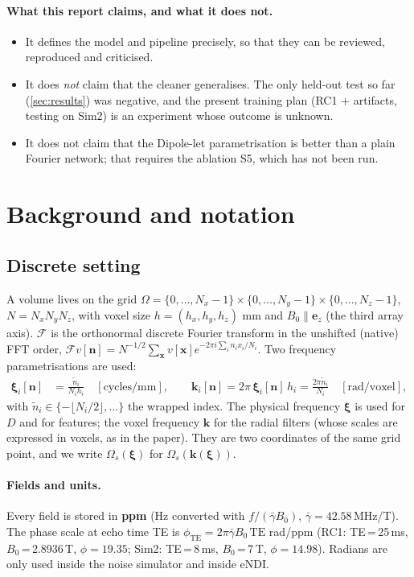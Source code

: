 \documentclass[11pt]{article}
\newcommand{\F}{\mathcal{F}}
\newcommand{\bk}{\bm{k}}
\newcommand{\bx}{\bm{x}}
\newcommand{\bxi}{\bm{\xi}}
\newcommand{\bn}{\bm{n}}
\theoremstyle{remark}
\begin{document}
\paragraph{What this report claims, and what it does not.}
\begin{itemize}[leftmargin=1.5em,itemsep=1pt]
\item It defines the model and pipeline precisely, so that they can be reviewed, reproduced and criticised.
\item It does \emph{not} claim that the cleaner generalises. The only held-out test so far (\cref{sec:results}) was negative, and the present training plan (RC1 + artifacts, testing on Sim2) is an
experiment whose outcome is unknown.
\item It does not claim that the Dipole-let parametrisation is better than a plain Fourier network; that requires the ablation S5, which has not been run.
\end{itemize}

\section{Background and notation}\label{sec:background}

\subsection{Discrete setting}
A volume lives on the grid $\Omega=\{0,\dots,N_x-1\}\times\{0,\dots,N_y-1\}\times\{0,\dots,N_z-1\}$, $N=N_xN_yN_z$, with voxel size $h=(h_x,h_y,h_z)$ mm and $B_0\parallel \bm e_z$ (the third array axis).
$\F$ is the orthonormal discrete Fourier transform in the unshifted (native) FFT order, $\F v[\bn]=N^{-1/2}\sum_{\bx} v[\bx]e^{-2\pi i\sum_i n_ix_i/N_i}$.
Two frequency parametrisations are used:
\begin{align}
\bxi_i[\bn]&=\frac{\tilde n_i}{N_ih_i}\quad[\text{cycles/mm}],\qquad
\bk_i[\bn]=2\pi\,\bxi_i[\bn]\,h_i=\frac{2\pi\tilde n_i}{N_i}\quad[\text{rad/voxel}],
\end{align}
with $\tilde n_i\in\{-\lfloor N_i/2\rfloor,\dots\}$ the wrapped index. The physical frequency $\bxi$ is used for $D$ and for features; the voxel frequency $\bk$ for the radial filters
(whose scales are expressed in voxels, as in the paper). They are two coordinates of the same grid point, and we write $\Omega_s(\bxi)$ for $\Omega_s(\bk(\bxi))$.

\paragraph{Fields and units.}
Every field is stored in \textbf{ppm} (Hz converted with $f/(\bar\gamma B_0)$, $\bar\gamma=42.58$\,MHz/T). The phase scale at echo time TE is $\phi_{\mathrm{TE}}=2\pi\bar\gamma B_0\,\mathrm{TE}$ rad/ppm
(RC1: TE\,=\,25\,ms, $B_0$\,=\,2.8936\,T, $\phi=19.35$; Sim2: TE\,=\,8\,ms, $B_0$\,=\,7\,T, $\phi=14.98$). Radians are only used inside the noise simulator and inside eNDI.
\end{document}
